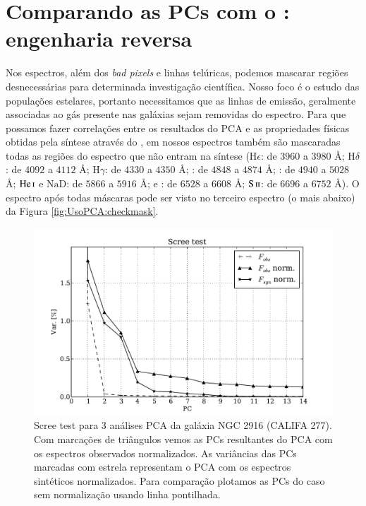 \section{Comparando as PCs com o \STARLIGHT: engenharia reversa}
\label{sec:UsoPCA:EngRev}

Nos espectros, além dos {\em bad pixels} e linhas telúricas, podemos mascarar regiões desnecessárias para determinada
investigação científica. Nosso foco é o estudo das populações estelares, portanto necessitamos que as linhas de emissão,
geralmente associadas ao gás presente nas galáxias \fixme sejam removidas do espectro. Para que possamos fazer
correlações entre os resultados do PCA e as propriedades físicas obtidas pela síntese através do \starlight, em nossos
espectros também são mascaradas todas as regiões do espectro que não entram na síntese ($\mathrm{H}\epsilon$: de $3960$
a $3980$ \AA; $\mathrm{H}\delta$: de $4092$ a $4112$ \AA; $\mathrm{H}\gamma$: de $4330$ a $4350$ \AA; \Hbeta: de $4848$
a $4874$ \AA; \oIII: de $4940$ a $5028$ \AA; $\mathrm{He\,\textsc{i}}$ e $\mathrm{NaD}$: de $5866$ a $5916$ \AA; \Halpha
e \nII: de $6528$ a $6608$ \AA; $\mathrm{S\,\textsc{ii}}$: de $6696$ a $6752$ \AA). O espectro após todas máscaras pode
ser visto no terceiro espectro (o mais abaixo) da Figura \ref{fig:UsoPCA:checkmask}.

\begin{figure}
    \includegraphics[width=1.\textwidth]{figuras/K0277-screetest.pdf}
    \caption[Scree test comparativo entre 3 PCAs.]
    {Scree test para 3 análises PCA da galáxia NGC 2916 (CALIFA 277). Com marcações de triângulos vemos as PCs
    resultantes do PCA com os espectros observados normalizados. As variâncias das PCs marcadas com estrela representam
    o PCA com os espectros sintéticos normalizados. Para comparação plotamos as PCs do caso sem normalização usando
    linha pontilhada.}
    \label{fig:UsoPCA:K0277scree}
\end{figure}


